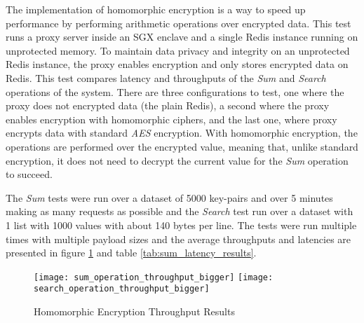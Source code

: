 The implementation of homomorphic encryption is a way to speed up performance by performing arithmetic operations over encrypted data. This test runs a proxy server inside an \gls{SGX} enclave and a single Redis instance running on unprotected memory. To maintain data privacy and integrity on an unprotected Redis instance, the proxy enables encryption and only stores encrypted data on Redis. This test compares latency and throughputs of the \textit{Sum} and \textit{Search} operations of the system. There are three configurations to test, one where the proxy does not encrypted data (the plain Redis), a second where the proxy enables encryption with homomorphic ciphers, and the last one, where proxy encrypts data with standard \textit{AES} encryption. With homomorphic encryption, the operations are performed over the encrypted value, meaning that, unlike standard encryption, it does not need to decrypt the current value for the \textit{Sum} operation to succeed.

The \textit{Sum} tests were run over a dataset of 5000 key-pairs and over 5 minutes making as many requests as possible and the \textit{Search} test run over a dataset with 1 list with 1000 values with about 140 bytes per line. The tests were run multiple times with multiple payload sizes and the average throughputs and latencies are presented in figure \ref{fig:homomorphic_encryption_throughput_results} and table \ref{tab:sum_latency_results}.

\begin{figure}[htbp]
  \centering
  \hspace*{-8mm}
    {\texttt{[image: sum\_operation\_throughput\_bigger]}}%
    {\texttt{[image: search\_operation\_throughput\_bigger]}}%
  \caption{Homomorphic Encryption Throughput Results}
  \label{fig:homomorphic_encryption_throughput_results}
\end{figure}

